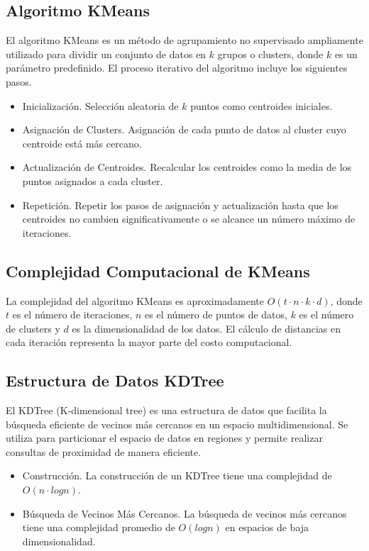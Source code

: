 \documentclass[conference]{IEEEtran}
\begin{document}
\subsection{Algoritmo KMeans}
El algoritmo KMeans es un método de agrupamiento no supervisado ampliamente utilizado para dividir un conjunto de datos en $k$ grupos o clusters, donde $k$ es un parámetro predefinido. El proceso iterativo del algoritmo incluye los siguientes pasos.
\begin{itemize}
\item{Inicialización.} Selección aleatoria de $k$ puntos como centroides iniciales.
\item{Asignación de Clusters.} Asignación de cada punto de datos al cluster cuyo centroide está más cercano.
\item{Actualización de Centroides.} Recalcular los centroides como la media de los puntos asignados a cada cluster.
\item{Repetición.} Repetir los pasos de asignación y actualización hasta que los centroides no cambien significativamente o se alcance un número máximo de iteraciones.
\end{itemize}

\subsection{Complejidad Computacional de KMeans}
La complejidad del algoritmo KMeans es aproximadamente  $O(t \cdot n \cdot k \cdot d)$, donde $t$ es el número de iteraciones, $n$ es el número de puntos de datos, $k$ es el número de clusters y $d$ es la dimensionalidad de los datos. El cálculo de distancias en cada iteración representa la mayor parte del costo computacional.

\subsection{Estructura de Datos KDTree}
El KDTree (K-dimensional tree) es una estructura de datos que facilita la búsqueda eficiente de vecinos más cercanos en un espacio multidimensional. Se utiliza para particionar el espacio de datos en regiones y permite realizar consultas de proximidad de manera eficiente.
\begin{itemize}
    \item{Construcción.} La construcción de un KDTree tiene una complejidad de $O(n \cdot log n)$.
    \item{Búsqueda de Vecinos Más Cercanos.} La búsqueda de vecinos más cercanos tiene una complejidad promedio de $O(log n)$ en espacios de baja dimensionalidad.
\end{itemize}
\end{document}
